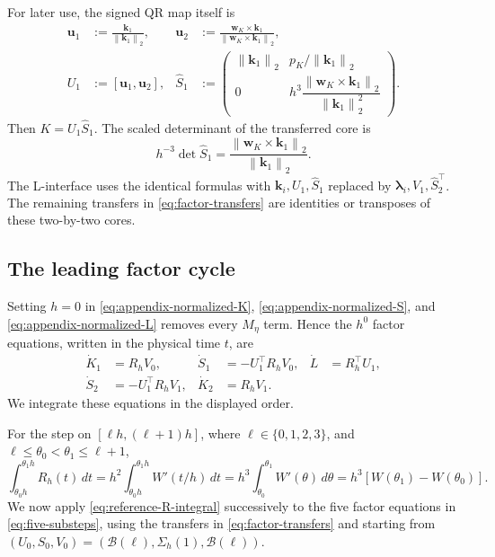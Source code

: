 \documentclass[10pt,a4paper]{amsart}
\numberwithin{equation}{section}
\newcommand{\norm}[1]{\left\lVert #1\right\rVert}
\begin{document}
For later use, the signed QR map itself is
\begin{align}
 \boldsymbol u_1&:=\frac{\boldsymbol k_1}{\norm{\boldsymbol k_1}_2},
 &\boldsymbol u_2&:=
 \frac{\boldsymbol w_K\times\boldsymbol k_1}
      {\norm{\boldsymbol w_K\times\boldsymbol k_1}_2},
 \label{eq:appendix-signed-QR-basis}\\
 U_1&:=[\boldsymbol u_1,\boldsymbol u_2],
 &\widehat S_1&:=
 \begin{pmatrix}
 \norm{\boldsymbol k_1}_2&p_K/\norm{\boldsymbol k_1}_2\\
 0&h^3
 \dfrac{\norm{\boldsymbol w_K\times\boldsymbol k_1}_2}
 {\norm{\boldsymbol k_1}_2^2}
 \end{pmatrix}.
 \label{eq:appendix-signed-QR-core}
\end{align}
Then \(K=U_1\widehat S_1\).  The scaled determinant of the
transferred core is
\begin{equation}\label{eq:appendix-signed-QR-determinant}
 h^{-3}\det\widehat S_1
 =\frac{\norm{\boldsymbol w_K\times\boldsymbol k_1}_2}
 {\norm{\boldsymbol k_1}_2}.
\end{equation}
The L-interface uses the identical formulas with
\(\boldsymbol k_i,U_1,\widehat S_1\) replaced by
\(\boldsymbol\lambda_i,V_1,\widehat S_2^\top\).  The remaining transfers
in \eqref{eq:factor-transfers} are identities or transposes of these
two-by-two cores.

\subsection{The leading factor cycle}
\label{app:leading-factor-cycle}

Setting $h=0$ in \eqref{eq:appendix-normalized-K},
\eqref{eq:appendix-normalized-S}, and
\eqref{eq:appendix-normalized-L} removes every $M_\eta$ term.  Hence the
$h^0$ factor equations, written in the physical time $t$, are
\begin{align*}
 \dot K_1&=R_hV_0,
 &\dot S_1&=-U_1^\top R_hV_0,
 &\dot L&=R_h^\top U_1,\\
 \dot S_2&=-U_1^\top R_hV_1,
 &\dot K_2&=R_hV_1.
\end{align*}
We integrate these equations in the displayed order.

For the step on $[\ell h,(\ell+1)h]$, where
$\ell\in\{0,1,2,3\}$, and
$\ell\le\theta_0<\theta_1\le\ell+1$,
\begin{equation}\label{eq:reference-R-integral}
 \int_{\theta_0h}^{\theta_1h}R_h(t)\,dt
 =h^2\int_{\theta_0h}^{\theta_1h}W'(t/h)\,dt
 =h^3\int_{\theta_0}^{\theta_1}W'(\theta)\,d\theta
 =h^3[W(\theta_1)-W(\theta_0)].
\end{equation}
We now apply \eqref{eq:reference-R-integral} successively to the five
factor equations in \eqref{eq:five-substeps}, using the transfers in
\eqref{eq:factor-transfers} and starting from
$(U_0,S_0,V_0)=(\mathcal B(\ell),\Sigma_h(1),\mathcal B(\ell))$.
\end{document}
